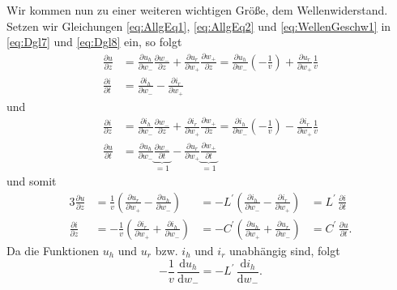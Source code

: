 \documentclass[paper=a4, parskip=half-, ngerman, fontsize=11pt]{scrreprt}
\begin{document}
Wir kommen nun zu einer weiteren wichtigen Größe, dem Wellenwiderstand.
Setzen wir Gleichungen \eqref{eq:AllgEq1}, \eqref{eq:AllgEq2} und \eqref{eq:WellenGeschw1} in \eqref{eq:Dgl7} und
\eqref{eq:Dgl8} ein, so folgt
\begin{align*}
    \frac{\partial u}{\partial z} &= \frac{\partial u_{h}}{\partial w_{-}} \frac{\partial w_{-}}{\partial z}
    + \frac{\partial u_{r}}{\partial w_{+}} \frac{\partial w_{+}}{\partial z}
    =
    \frac{\partial u_{h}}{\partial w_{-}} \left(- \frac{1}{v} \right) + \frac{\partial u_{r}}{\partial w_{+}}
    \frac{1}{v} \\[1ex]
    \frac{\partial i}{\partial t} &= \frac{\partial i_{h}}{\partial w_{-}} - \frac{\partial i_{r}}{\partial w_{+}}
\end{align*}
und
\begin{align*}
    \frac{\partial i}{\partial z} &= \frac{\partial i_{h}}{\partial w_{-}} \frac{\partial w_{-}}{\partial z}
    + \frac{\partial i_{r}}{\partial w_{+}} \frac{\partial w_{+}}{\partial z}
    =
    \frac{\partial i_{h}}{\partial w_{-}} \left(- \frac{1}{v} \right) - \frac{\partial i_{r}}{\partial w_{+}}
    \frac{1}{v} \\[1ex]
    \frac{\partial u}{\partial t} &= \frac{\partial u_{h}}{\partial w_{-}}
    \underbrace{\frac{\partial w_{-}}{\partial t} }_{=1}
    -
    \frac{\partial u_{r}}{\partial w_{+}} \underbrace{\frac{\partial w_{+}}{\partial t} }_{=1}
\end{align*}
und somit
\begin{alignat*}{3}
    \frac{\partial u}{\partial z} &= \frac{1}{v} \left( \frac{\partial u_{r}}{\partial w_{+}} -
    \frac{\partial u_{h}}{\partial w_{-}} \right) &= - L^{\prime} \left( \frac{\partial i_{h}}{\partial w_{-}} -
    \frac{\partial i_{r}}{\partial w_{+}} \right) &= L^{\prime} \, \frac{\partial i}{\partial t} \\[1ex]
    \frac{\partial i}{\partial z} &= - \frac{1}{v} \left( \frac{\partial i_{r}}{\partial w_{+}} +
    \frac{\partial i_{h}}{\partial w_{-}} \right) &= - C^{\prime} \left( \frac{\partial u_{h}}{\partial w_{+}} +
    \frac{\partial u_{r}}{\partial w_{-}} \right) &= C^{\prime} \, \frac{\partial u}{\partial t}.
\end{alignat*}
Da die Funktionen $u_{h}$ und $u_{r}$ bzw. $i_{h}$ und $i_{r}$ unabhängig sind, folgt
\begin{equation*}
    - \frac{1}{v} \, \frac{\text{d} u_{h}}{\text{d} w_{-}} = - L^{\prime} \, \frac{\text{d} i_{h}}{\text{d} w_{-}}.
\end{equation*}
\end{document}
